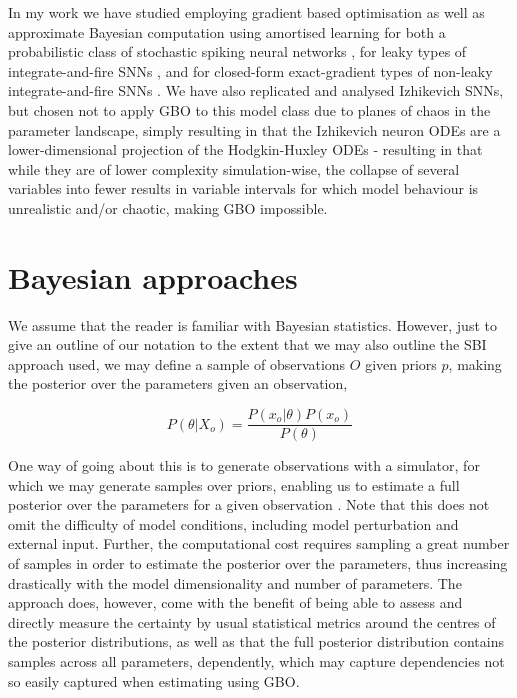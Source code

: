 \documentclass[mphil,deptreport,ianc]{infthesis} %
\begin{document}
In my work we have studied employing gradient based optimisation as well as approximate Bayesian computation using amortised learning for both a probabilistic class of stochastic spiking neural networks \cite{Rene2020}, for leaky types of integrate-and-fire SNNs \cite{allen_glif_white_paper}, and for closed-form exact-gradient types of non-leaky integrate-and-fire SNNs \cite{Huh2017}.
We have also replicated and analysed Izhikevich SNNs, but chosen not to apply GBO to this model class due to planes of chaos in the parameter landscape, simply resulting in that the Izhikevich neuron ODEs are a lower-dimensional projection of the Hodgkin-Huxley ODEs - resulting in that while they are of lower complexity simulation-wise, the collapse of several variables into fewer results in variable intervals for which model behaviour is unrealistic and/or chaotic, making GBO impossible.


\section{Bayesian approaches}

We assume that the reader is familiar with Bayesian statistics. However, just to give an outline of our notation to the extent that we may also outline the SBI approach used, we may define a sample of observations $O$ given priors $p$, making the posterior over the parameters given an observation,

\begin{equation}
    P(\theta|X_o) = \frac{P(x_o|\theta)P(x_o)}{P(\theta)}
\end{equation}

One way of going about this is to generate observations with a simulator, for which we may generate samples over priors, enabling us to estimate a full posterior over the parameters for a given observation \cite{Lueckmann2017, Lueckmann2018}.
Note that this does not omit the difficulty of model conditions, including model perturbation and external input.
Further, the computational cost requires sampling a great number of samples in order to estimate the posterior over the parameters, thus increasing drastically with the model dimensionality and number of parameters.
The approach does, however, come with the benefit of being able to assess and directly measure the certainty by usual statistical metrics around the centres of the posterior distributions, as well as that the full posterior distribution contains samples across all parameters, dependently, which may capture dependencies not so easily captured when estimating using GBO.
\end{document}
